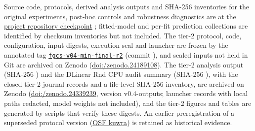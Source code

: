 Source code, protocols, derived analysis outputs and SHA-256 inventories for
the original experiments, post-hoc controls and robustness diagnostics are at
the
\href{https://github.com/KADOUMAAbdelhak/TimeTrack-Forecasting-Framework/tree/0e8cad884896a706f62f0fae4ab2b52812f9b033}{project repository checkpoint}
\texttt{}; fitted-model and
per-fit prediction collections are identified by checksum inventories but not
included. The tier-2 protocol, code, configuration, input digests, execution
seal and launcher are frozen by the annotated tag
\href{https://github.com/KADOUMAAbdelhak/TimeTrack-Forecasting-Framework/tree/fgcs-v04-min-final-r2}{\texttt{fgcs-v04-min-final-r2}}
(commit \texttt{}), and
sealed inputs not held in Git are archived on Zenodo
(\href{https://doi.org/10.5281/zenodo.24189108}{doi:/\allowbreak zenodo.24189108}).
The tier-2 analysis output (SHA-256
\texttt{})
and the DLinear Rnd CPU audit summary (SHA-256
\texttt{}),
with the closed tier-2 journal records and a file-level SHA-256 inventory, are
archived on Zenodo
(\href{https://doi.org/10.5281/zenodo.24339239}{doi:/\allowbreak zenodo.24339239},
version v0.4-outputs; launcher records with local paths redacted, model
weights not included), and the tier-2 figures and tables are generated by
scripts that verify these digests. An earlier preregistration of a superseded
protocol version (\href{https://osf.io/kuwra}{OSF kuwra}) is retained as
historical evidence.

